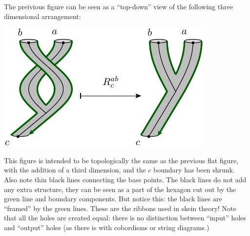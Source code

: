 \documentclass[aps, prl, letterpaper, twocolumn, superscriptaddress, notitlepage, 10pt]{revtex4-1}
\begin{document}

The preivious figure can be seen as a ``top-down'' view of the
following three dimensional arrangement:
\begin{center}
\includegraphics[]{pic-rmove-skein.pdf}
\end{center}
This figure is intended to be topologically
the same as the previous flat figure,
with the addition of a third dimension,
and the $c$ boundary has been shrunk.
Also note thin black lines
connecting the base points.
The black lines do not add any extra structure, they can
be seen as a part of the hexagon cut out by
the green line and boundary components.
But notice this: the black lines are ``framed'' by the green lines. 
These are the ribbons used in skein theory!
Note that all the holes are created equal: there is
no distinction between ``input'' holes and ``output'' holes
(as there is with cobordisms or string diagrams.)

\end{document}
